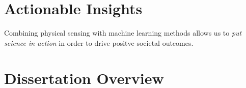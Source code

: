 \section{Actionable Insights}

Combining physical sensing with machine learning methods allows us to \textit{put science in action} in order to drive positve societal outcomes.


\section{Dissertation Overview}

